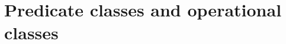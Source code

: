 \documentclass[a4paper,10pt,runningheads]{llncs}
\begin{document}
% 
% 
% 

\section{Predicate classes and operational classes}\label{predicateclasses}
\end{document}
